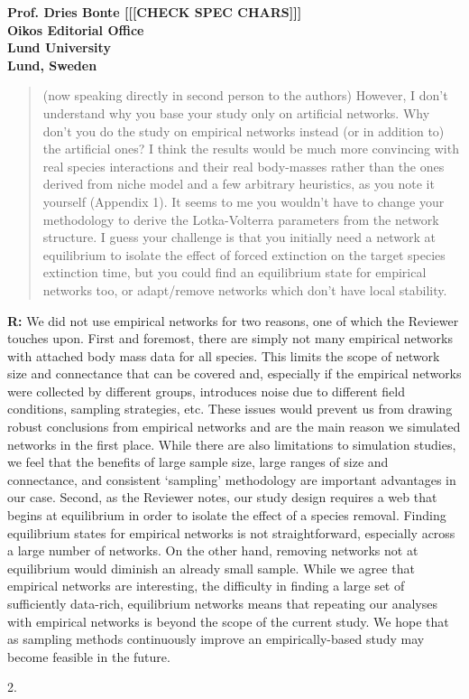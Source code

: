 \documentclass[12pt]{letter}
\begin{document}
\begin{letter}{\bf Prof. Dries Bonte [[[CHECK SPEC CHARS]]]\\
Oikos Editorial Office \\
Lund University \\
Lund, Sweden}
\begin{quotation}
  (now speaking directly in second person to the authors) However, I don’t understand why you base your study only on artificial networks. Why don’t you do the study on empirical networks instead (or in addition to) the artificial ones? I think the results would be much more convincing with real species interactions and their real body-masses rather than the ones derived from niche model and a few arbitrary heuristics, as you note it yourself (Appendix 1). It seems to me you wouldn’t have to change your methodology to derive the Lotka-Volterra parameters from the network structure. I guess your challenge is that you initially need a network at equilibrium to isolate the effect of forced extinction on the target species extinction time, but you could find an equilibrium state for empirical networks too, or adapt/remove networks which don’t have local stability.
  \end{quotation}


  \textbf{R:} We did not use empirical networks for two reasons, one of which the Reviewer touches upon. First and foremost, there are simply not many empirical networks with attached body mass data for all species. This limits the scope of network size and connectance that can be covered and, especially if the empirical networks were collected by different groups, introduces noise due to different field conditions, sampling strategies, etc. These issues would prevent us from drawing robust conclusions from empirical networks and are the main reason we simulated networks in the first place. While there are also limitations to simulation studies, we feel that the benefits of large sample size, large ranges of size and connectance, and consistent `sampling' methodology are important advantages in our case.
  Second, as the Reviewer notes, our study design requires a web that begins at equilibrium in order to isolate the effect of a species removal. Finding equilibrium states for empirical networks is not straightforward, especially across a large number of networks. On the other hand, removing networks not at equilibrium would diminish an already small sample. While we agree that empirical networks are interesting, the difficulty in finding a large set of sufficiently data-rich, equilibrium networks means that repeating our analyses with empirical networks is beyond the scope of the current study.
  We hope that as sampling methods continuously improve an empirically-based study may become feasible in the future.


2. 


\end{letter}
\end{document}
